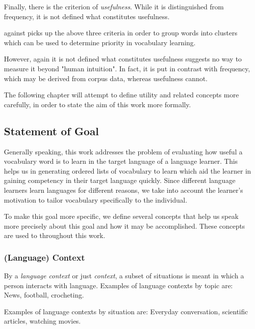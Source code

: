 Finally, there is the criterion of \textit{usefulness}.
While it is distinguished from frequency, it is not defined what constitutes usefulness.

 against picks up the above three criteria in order to group words into clusters which can be used to determine priority in vocabulary learning.

However, again it is not defined what constitutes usefulness suggests no way to measure it beyond "human intuition".
In fact, it is put in contrast with frequency, which may be derived from corpus data, whereas usefulness cannot.

The following chapter will attempt to define utility and related concepts more carefully, in order to state the aim of this work more formally.

\subsection{Statement of Goal} \label{sec:statement-of-goal}

Generally speaking, this work addresses the problem of evaluating how useful a vocabulary word is to learn in the target language of a language learner.
This helps us in generating ordered lists of vocabulary to learn which aid the learner in gaining competency in their target language quickly.
Since different language learners learn languages for different reasons, we take into account the learner's motivation to tailor vocabulary specifically to the individual.

To make this goal more specific, we define several concepts that help us speak more precisely about this goal and how it may be accomplished.
These concepts are used to throughout this work.

\subsubsection{(Language) Context}
By a \textit{language context} or just \textit{context}, a subset of situations is meant in which a person interacts with language.
Examples of language contexts by topic are:
News, football, crocheting.

Examples of language contexts by situation are:
Everyday conversation, scientific articles, watching movies.

